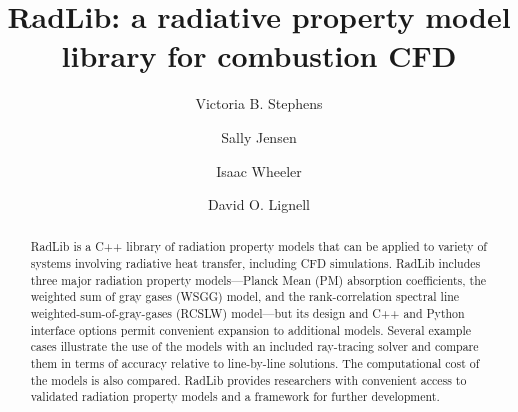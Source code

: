 \documentclass[preprint,12pt]{elsarticle}
\begin{document}
\begin{frontmatter}



\title{RadLib: a radiative property model library for combustion CFD}




\author{Victoria B. Stephens}
\author{Sally Jensen}
\author{Isaac Wheeler}
\author{David O. Lignell}


\address{Department of Chemical Engineering, Brigham Young University, Provo, UT 84602, United States}

\begin{abstract}
RadLib is a C++ library of radiation property models that can be applied to variety of systems involving radiative heat transfer, including CFD simulations. RadLib includes three major radiation property models---Planck Mean (PM) absorption coefficients, the weighted sum of gray gases (WSGG) model, and the rank-correlation spectral line weighted-sum-of-gray-gases (RCSLW) model---but its design and C++ and Python interface options permit convenient expansion to additional models. Several example cases illustrate the use of the models with an included ray-tracing solver and compare them in terms of accuracy relative to line-by-line solutions. The computational cost of the models is also compared. RadLib provides researchers with convenient access to validated radiation property models and a framework for further development. 
\end{abstract}



\end{frontmatter}
\end{document}
